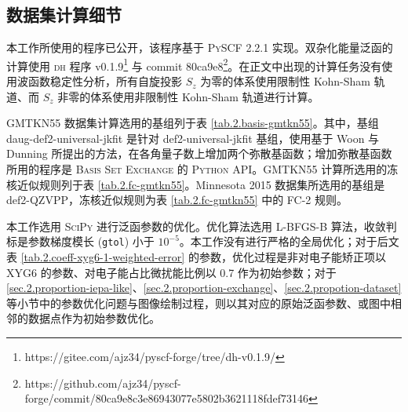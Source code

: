 \subsection{数据集计算细节}

本工作所使用的程序已公开\cite{dh.ajz34}，该程序基于 \textsc{PySCF} 2.2.1 实现\cite{Sun-Chan.WCMS.2018, Sun-Chan.JCP.2020}。双杂化能量泛函的计算使用 \textsc{dh} 程序 v0.1.9\footnote{https://gitee.com/ajz34/pyscf-forge/tree/dh-v0.1.9/} 与 commit 80ca9e8\footnote{https://github.com/ajz34/pyscf-forge/commit/80ca9e8c3e86943077e5802b3621118fdef73146}。在正文中出现的计算任务没有使用波函数稳定性分析，所有自旋投影 $S_z$ 为零的体系使用限制性 Kohn-Sham 轨道、而 $S_z$ 非零的体系使用非限制性 Kohn-Sham 轨道进行计算。

GMTKN55 数据集计算选用的基组列于表 \ref{tab.2.basis-gmtkn55}。其中，基组 daug-def2-universal-jkfit 是针对 def2-universal-jkfit 基组，使用基于 Woon 与 Dunning 所提出的方法\cite{Woon-Dunning.JCP.1994}，在各角量子数上增加两个弥散基函数；增加弥散基函数所用的程序是 \textsc{Basis Set Exchange} 的 \textsc{Python} API\cite{Feller-Feller.JCC.1996, Schuchardt-Windus.JCIM.2007, Pritchard-Windus.JCIM.2019}。GMTKN55 计算所选用的冻核近似规则列于表 \ref{tab.2.fc-gmtkn55}。Minnesota 2015 数据集所选用的基组是 def2-QZVPP\cite{10.1007/BF01112983, 10.1007/BF00528565, 10.1063/1.1622924, 10.1063/1.1305880, 10.1007/s002149900101, 10.1016/0009-2614(96)00382-x, 10.1063/1.459993, 10.1007/bf01114537, 10.1039/b508541a, 10.1063/1.1406535, 10.1063/1.456066, 10.1021/ct300302u, 10.1063/1.1627293}，冻核近似规则为表 \ref{tab.2.fc-gmtkn55} 中的 FC-2 规则。

本工作选用 \textsc{SciPy}\cite{Virtanen-Vazquez-Baeza.NM.2020} 进行泛函参数的优化。优化算法选用 L-BFGS-B 算法\cite{Byrd-Zhu.SJSC.1995}，收敛判标是参数梯度模长 (\verb|gtol|) 小于 $10^{-5}$。本工作没有进行严格的全局优化；对于后文表 \ref{tab.2.coeff-xyg6-1-weighted-error} 的参数，优化过程是非对电子能矫正项以 XYG6 的参数、对电子能占比微扰能比例以 0.7 作为初始参数；对于 \ref{sec.2.proportion-iepa-like}、\ref{sec.2.proportion-exchange}、\ref{sec.2.propotion-dataset} 等小节中的参数优化问题与图像绘制过程，则以其对应的原始泛函参数、或图中相邻的数据点作为初始参数优化。

